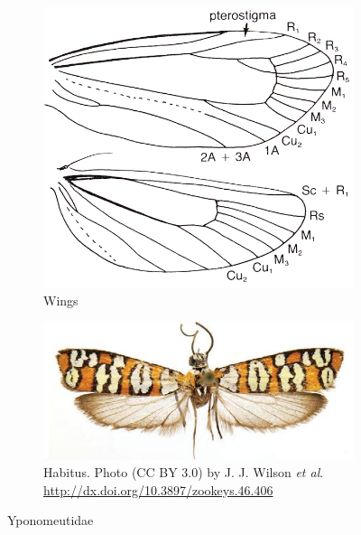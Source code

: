 \documentclass[letterpaper, 11pt]{article}
\begin{document}
\begin{figure}[ht!]
    \centering
    \begin{subfigure}[ht!]{0.36\textwidth}
        \includegraphics[width=\textwidth]{image40}
        \caption{Wings}
        \label{fig:ypono1}
    \end{subfigure}
    \qquad %
    \begin{subfigure}[ht!]{0.45\textwidth}
        \includegraphics[width=\textwidth]{ypono}
        \caption{Habitus. Photo (CC BY 3.0) by J. J. Wilson \textit{et al}. \url{http://dx.doi.org/10.3897/zookeys.46.406}}
        \label{fig:ypono2}
    \end{subfigure}
    \caption{Yponomeutidae}\label{fig:yponomeutids}
\end{figure}
\end{document}
